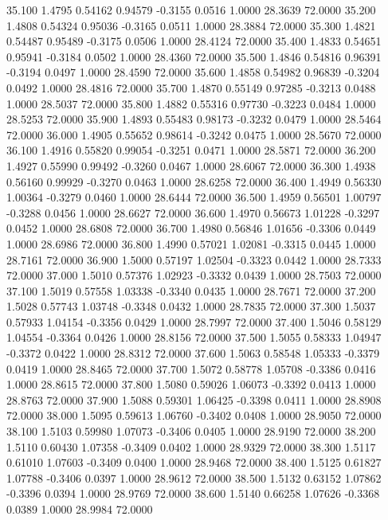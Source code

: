   35.100   1.4795   0.54162   0.94579  -0.3155   0.0516   1.0000  28.3639  72.0000
  35.200   1.4808   0.54324   0.95036  -0.3165   0.0511   1.0000  28.3884  72.0000
  35.300   1.4821   0.54487   0.95489  -0.3175   0.0506   1.0000  28.4124  72.0000
  35.400   1.4833   0.54651   0.95941  -0.3184   0.0502   1.0000  28.4360  72.0000
  35.500   1.4846   0.54816   0.96391  -0.3194   0.0497   1.0000  28.4590  72.0000
  35.600   1.4858   0.54982   0.96839  -0.3204   0.0492   1.0000  28.4816  72.0000
  35.700   1.4870   0.55149   0.97285  -0.3213   0.0488   1.0000  28.5037  72.0000
  35.800   1.4882   0.55316   0.97730  -0.3223   0.0484   1.0000  28.5253  72.0000
  35.900   1.4893   0.55483   0.98173  -0.3232   0.0479   1.0000  28.5464  72.0000
  36.000   1.4905   0.55652   0.98614  -0.3242   0.0475   1.0000  28.5670  72.0000
  36.100   1.4916   0.55820   0.99054  -0.3251   0.0471   1.0000  28.5871  72.0000
  36.200   1.4927   0.55990   0.99492  -0.3260   0.0467   1.0000  28.6067  72.0000
  36.300   1.4938   0.56160   0.99929  -0.3270   0.0463   1.0000  28.6258  72.0000
  36.400   1.4949   0.56330   1.00364  -0.3279   0.0460   1.0000  28.6444  72.0000
  36.500   1.4959   0.56501   1.00797  -0.3288   0.0456   1.0000  28.6627  72.0000
  36.600   1.4970   0.56673   1.01228  -0.3297   0.0452   1.0000  28.6808  72.0000
  36.700   1.4980   0.56846   1.01656  -0.3306   0.0449   1.0000  28.6986  72.0000
  36.800   1.4990   0.57021   1.02081  -0.3315   0.0445   1.0000  28.7161  72.0000
  36.900   1.5000   0.57197   1.02504  -0.3323   0.0442   1.0000  28.7333  72.0000
  37.000   1.5010   0.57376   1.02923  -0.3332   0.0439   1.0000  28.7503  72.0000
  37.100   1.5019   0.57558   1.03338  -0.3340   0.0435   1.0000  28.7671  72.0000
  37.200   1.5028   0.57743   1.03748  -0.3348   0.0432   1.0000  28.7835  72.0000
  37.300   1.5037   0.57933   1.04154  -0.3356   0.0429   1.0000  28.7997  72.0000
  37.400   1.5046   0.58129   1.04554  -0.3364   0.0426   1.0000  28.8156  72.0000
  37.500   1.5055   0.58333   1.04947  -0.3372   0.0422   1.0000  28.8312  72.0000
  37.600   1.5063   0.58548   1.05333  -0.3379   0.0419   1.0000  28.8465  72.0000
  37.700   1.5072   0.58778   1.05708  -0.3386   0.0416   1.0000  28.8615  72.0000
  37.800   1.5080   0.59026   1.06073  -0.3392   0.0413   1.0000  28.8763  72.0000
  37.900   1.5088   0.59301   1.06425  -0.3398   0.0411   1.0000  28.8908  72.0000
  38.000   1.5095   0.59613   1.06760  -0.3402   0.0408   1.0000  28.9050  72.0000
  38.100   1.5103   0.59980   1.07073  -0.3406   0.0405   1.0000  28.9190  72.0000
  38.200   1.5110   0.60430   1.07358  -0.3409   0.0402   1.0000  28.9329  72.0000
  38.300   1.5117   0.61010   1.07603  -0.3409   0.0400   1.0000  28.9468  72.0000
  38.400   1.5125   0.61827   1.07788  -0.3406   0.0397   1.0000  28.9612  72.0000
  38.500   1.5132   0.63152   1.07862  -0.3396   0.0394   1.0000  28.9769  72.0000
  38.600   1.5140   0.66258   1.07626  -0.3368   0.0389   1.0000  28.9984  72.0000
